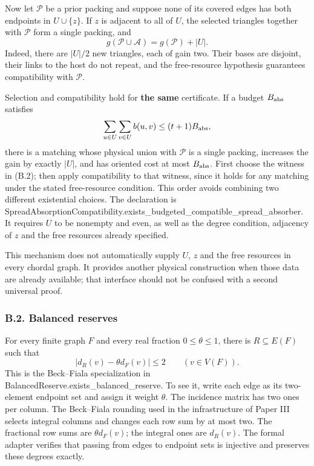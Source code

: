 \documentclass[english,11pt,a4paper]{article}
\newcounter{none}
\begin{document}
Now let \(\mathcal P\) be a prior packing and suppose none of its covered edges has both endpoints in \(U\cup\{z\}\). If \(z\) is adjacent to all of \(U\), the selected triangles together with \(\mathcal P\) form a single packing, and \[
g(\mathcal P\cup\mathcal A)=g(\mathcal P)+|U|.
\tag{B.3}
\] Indeed, there are \(|U|/2\) new triangles, each of gain two. Their bases are disjoint, their links to the host do not repeat, and the free-resource hypothesis guarantees compatibility with \(\mathcal P\).

Selection and compatibility hold for \textbf{the same} certificate. If a budget \(B_{\rm abs}\) satisfies \[
\sum_{u\in U}\sum_{v\in U}b(u,v)\le(t+1)B_{\rm abs},
\] there is a matching whose physical union with \(\mathcal P\) is a single packing, increases the gain by exactly \(|U|\), and has oriented cost at most \(B_{\rm abs}\). First choose the witness in (B.2); then apply compatibility to that witness, since it holds for any matching under the stated free-resource condition. This order avoids combining two different existential choices. The declaration is {\ttfamily\small SpreadAbsorp\discretionary{\hbox{\ensuremath{\hookrightarrow}}}{}{}tionCompatib\discretionary{\hbox{\ensuremath{\hookrightarrow}}}{}{}ility.\discretionary{\hbox{\ensuremath{\hookrightarrow}}}{}{}exists\_\discretionary{\hbox{\ensuremath{\hookrightarrow}}}{}{}budgeted\_\discretionary{\hbox{\ensuremath{\hookrightarrow}}}{}{}compatible\_\discretionary{\hbox{\ensuremath{\hookrightarrow}}}{}{}spread\_\discretionary{\hbox{\ensuremath{\hookrightarrow}}}{}{}absorber}. It requires \(U\) to be nonempty and even, as well as the degree condition, adjacency of \(z\) and the free resources already specified.

This mechanism does not automatically supply \(U\), \(z\) and the free resources in every chordal graph. It provides another physical construction when those data are already available; that interface should not be confused with a second universal proof.

\subsubsection{B.2. Balanced reserves}\label{b.2.-balanced-reserves}

For every finite graph \(F\) and every real fraction \(0\le\theta\le1\), there is \(R\subseteq E(F)\) such that \[
|d_R(v)-\theta d_F(v)|\le2\qquad(v\in V(F)).
\tag{B.4}
\] This is the Beck--Fiala specialization in {\ttfamily\small BalancedRese\discretionary{\hbox{\ensuremath{\hookrightarrow}}}{}{}rve.\discretionary{\hbox{\ensuremath{\hookrightarrow}}}{}{}exists\_\discretionary{\hbox{\ensuremath{\hookrightarrow}}}{}{}balanced\_\discretionary{\hbox{\ensuremath{\hookrightarrow}}}{}{}reserve}. To see it, write each edge as its two-element endpoint set and assign it weight \(\theta\). The incidence matrix has two ones per column. The Beck--Fiala rounding used in the infrastructure of Paper III selects integral columns and changes each row sum by at most two. The fractional row sums are \(\theta d_F(v)\); the integral ones are \(d_R(v)\). The formal adapter verifies that passing from edges to endpoint sets is injective and preserves these degrees exactly.
\end{document}
